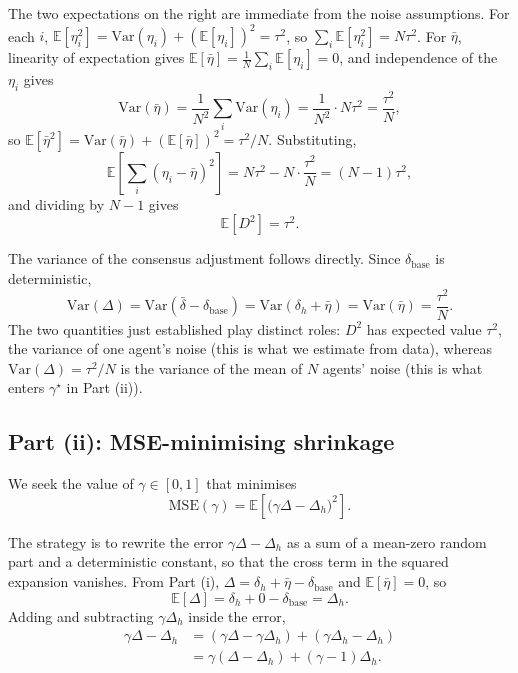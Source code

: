\documentclass{article}
\begin{document}
The two expectations on the right are immediate from the noise 
assumptions. For each $i$, $\mathbb{E}[\eta_i^2] = 
\mathrm{Var}(\eta_i) + (\mathbb{E}[\eta_i])^2 = \tau^2$, so 
$\sum_i \mathbb{E}[\eta_i^2] = N\tau^2$. For $\bar\eta$, linearity 
of expectation gives $\mathbb{E}[\bar\eta] = \tfrac{1}{N}\sum_i 
\mathbb{E}[\eta_i] = 0$, and independence of the $\eta_i$ gives
\begin{equation*}
\mathrm{Var}(\bar\eta) 
= \frac{1}{N^2}\sum_i \mathrm{Var}(\eta_i)
= \frac{1}{N^2} \cdot N\tau^2 = \frac{\tau^2}{N},
\end{equation*}
so $\mathbb{E}[\bar\eta^2] = \mathrm{Var}(\bar\eta) + 
(\mathbb{E}[\bar\eta])^2 = \tau^2/N$. Substituting,
\begin{equation*}
\mathbb{E}\!\left[\sum_i (\eta_i - \bar\eta)^2\right] 
= N\tau^2 - N \cdot \frac{\tau^2}{N} = (N-1)\tau^2,
\end{equation*}
and dividing by $N-1$ gives
\begin{equation}
\mathbb{E}[D^2] = \tau^2.
\label{eq:D2-unbiased}
\end{equation}

The variance of the consensus adjustment follows directly. Since 
$\delta_{\text{base}}$ is deterministic,
\begin{equation*}
\mathrm{Var}(\Delta) = \mathrm{Var}(\bar\delta - \delta_{\text{base}}) 
= \mathrm{Var}(\delta_h + \bar\eta) 
= \mathrm{Var}(\bar\eta) = \frac{\tau^2}{N}.
\end{equation*}
The two quantities just established play distinct roles: $D^2$ has 
expected value $\tau^2$, the variance of one agent's noise (this 
is what we estimate from data), whereas $\mathrm{Var}(\Delta) = 
\tau^2/N$ is the variance of the mean of $N$ agents' noise (this 
is what enters $\gamma^\star$ in Part (ii)).

\subsection*{Part (ii): MSE-minimising shrinkage}

We seek the value of $\gamma \in [0,1]$ that minimises
\begin{equation*}
\mathrm{MSE}(\gamma) = \mathbb{E}\!\left[\big(\gamma\Delta - 
\Delta_h\big)^2\right].
\end{equation*}

The strategy is to rewrite the error $\gamma\Delta - \Delta_h$ as 
a sum of a mean-zero random part and a deterministic constant, so 
that the cross term in the squared expansion vanishes. From Part 
(i), $\Delta = \delta_h + \bar\eta - \delta_{\text{base}}$ and 
$\mathbb{E}[\bar\eta] = 0$, so
\begin{equation*}
\mathbb{E}[\Delta] = \delta_h + 0 - \delta_{\text{base}} = \Delta_h.
\end{equation*}
Adding and subtracting $\gamma\Delta_h$ inside the error,
\begin{align*}
\gamma\Delta - \Delta_h 
&= (\gamma\Delta - \gamma\Delta_h) + (\gamma\Delta_h - \Delta_h) \\
&= \gamma(\Delta - \Delta_h) + (\gamma - 1)\Delta_h.
\end{align*}
\end{document}
